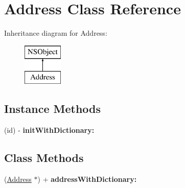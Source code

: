\hypertarget{interface_address}{\section{Address Class Reference}
\label{interface_address}
}
Inheritance diagram for Address\-:\begin{figure}[H]
\begin{center}
\leavevmode
\includegraphics[height=2.000000cm]{interface_address}
\end{center}
\end{figure}
\subsection*{Instance Methods}
\begin{DoxyCompactItemize}
\item 
\hypertarget{interface_address_aaddeca97436531e934e9faabc74b5c81}{(id) -\/ {\bfseries init\-With\-Dictionary\-:}}\label{interface_address_aaddeca97436531e934e9faabc74b5c81}

\end{DoxyCompactItemize}
\subsection*{Class Methods}
\begin{DoxyCompactItemize}
\item 
\hypertarget{interface_address_acedade83516d78418c2208c113b21092}{(\hyperlink{interface_address}{Address} $\ast$) + {\bfseries address\-With\-Dictionary\-:}}\label{interface_address_acedade83516d78418c2208c113b21092}

\end{DoxyCompactItemize}

